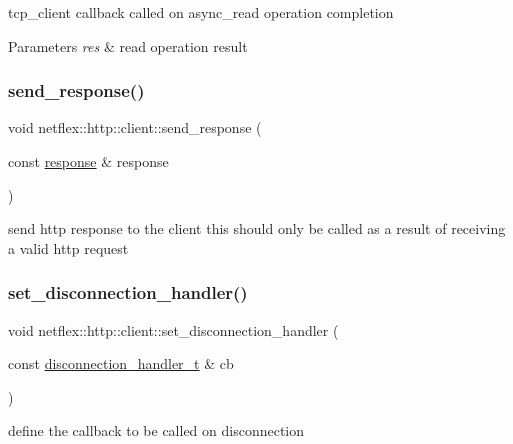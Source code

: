 tcp\+\_\+client callback called on async\+\_\+read operation completion


\begin{DoxyParams}{Parameters}
{\em res} & read operation result \\
\hline
\end{DoxyParams}
\mbox{\label{classnetflex_1_1http_1_1client_a8b00e06dfa90d8c96f9773ce043d0776}} 
\subsubsection{\texorpdfstring{send\+\_\+response()}{send\_response()}}
{\footnotesize\ttfamily void netflex\+::http\+::client\+::send\+\_\+response (\begin{DoxyParamCaption}\item[{const \hyperlink{classnetflex_1_1http_1_1response}{response} \&}]{response }\end{DoxyParamCaption})}

send http response to the client this should only be called as a result of receiving a valid http request \mbox{\label{classnetflex_1_1http_1_1client_a5da02e72625f4e8fbc8e8c64dcaca02a}} 
\subsubsection{\texorpdfstring{set\+\_\+disconnection\+\_\+handler()}{set\_disconnection\_handler()}}
{\footnotesize\ttfamily void netflex\+::http\+::client\+::set\+\_\+disconnection\+\_\+handler (\begin{DoxyParamCaption}\item[{const \hyperlink{classnetflex_1_1http_1_1client_acacb8798dcade63c52a674b3f7820fba}{disconnection\+\_\+handler\+\_\+t} \&}]{cb }\end{DoxyParamCaption})}

define the callback to be called on disconnection


